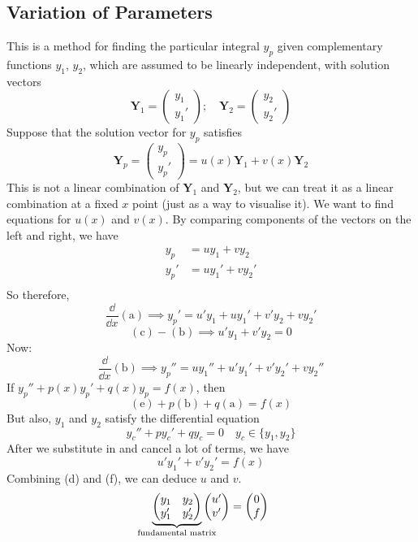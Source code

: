 \documentclass{article}
\begin{document}
\subsection{Variation of Parameters}
This is a method for finding the particular integral $y_p$ given complementary functions $y_1$, $y_2$, which are assumed to be linearly independent, with solution vectors
\[ \bm Y_1 = \begin{pmatrix}
		y_1 \\ y_1'
	\end{pmatrix};\quad \bm Y_2 = \begin{pmatrix}
		y_2 \\ y_2'
	\end{pmatrix} \]
Suppose that the solution vector for $y_p$ satisfies
\begin{equation}\label{varparam1}
	\bm Y_p = \begin{pmatrix}
		y_p \\ y_p'
	\end{pmatrix} = u(x)\bm Y_1 + v(x)\bm Y_2
\end{equation}
This is not a linear combination of $\bm Y_1$ and $\bm Y_2$, but we can treat it as a linear combination at a fixed $x$ point (just as a way to visualise it). We want to find equations for $u(x)$ and $v(x)$. By comparing components of the vectors on the left and right, we have
\begin{align*}
	y_p  & = uy_1 + vy_2 \tag{a}   \\
	y_p' & = uy_1' + vy_2' \tag{b} \\
\end{align*}
So therefore,
\[ \frac{\dd}{\dd x}(\mathrm a) \implies y_p' = u'y_1 + uy_1' + v'y_2 + vy_2' \tag{c} \]
\[ (\mathrm c) - (\mathrm b) \implies u'y_1 + v'y_2 = 0 \tag{d} \]
Now:
\[ \frac{\dd}{\dd x}(\mathrm b) \implies y_p'' = uy_1'' + u'y_1' + v'y_2' + vy_2'' \tag{e} \]
If $y_p'' + p(x)y_p' + q(x)y_p = f(x)$, then
\[ (\mathrm e) + p(\mathrm b) + q(\mathrm a) = f(x) \]
But also, $y_1$ and $y_2$ satisfy the differential equation
\[ y_c'' + py_c' + qy_c = 0\quad y_c \in \{ y_1, y_2 \} \]
After we substitute in and cancel a lot of terms, we have
\[ u'y_1' + v'y_2' = f(x) \tag{f} \]
Combining (d) and (f), we can deduce $u$ and $v$.
\[ \underbrace{\begin{pmatrix}
			y_1 & y_2 \\ y_1' & y_2'
		\end{pmatrix}}_{\mathclap{\text{fundamental matrix}}} \begin{pmatrix}
		u' \\ v'
	\end{pmatrix} = \begin{pmatrix}
		0 \\ f
	\end{pmatrix} \]
\end{document}
